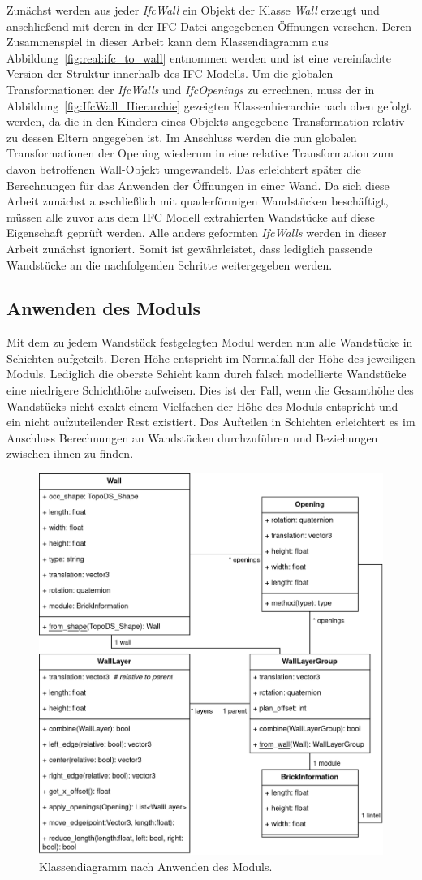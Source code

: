 Zunächst werden aus jeder \textit{IfcWall} ein Objekt der Klasse \textit{Wall} erzeugt und anschließend mit deren in der IFC Datei angegebenen Öffnungen versehen.
Deren Zusammenspiel in dieser Arbeit kann dem Klassendiagramm aus Abbildung~\ref{fig:real:ifc_to_wall} entnommen werden und ist eine vereinfachte Version der Struktur innerhalb des IFC Modells.
Um die globalen Transformationen der \textit{IfcWalls} und \textit{IfcOpenings} zu errechnen, muss der in Abbildung~\ref{fig:IfcWall_Hierarchie} gezeigten Klassenhierarchie nach oben gefolgt werden, da die in den Kindern eines Objekts angegebene Transformation relativ zu dessen Eltern angegeben ist.
Im Anschluss werden die nun globalen Transformationen der Opening wiederum in eine relative Transformation zum davon betroffenen Wall-Objekt umgewandelt.
Das erleichtert später die Berechnungen für das Anwenden der Öffnungen in einer Wand.
Da sich diese Arbeit zunächst ausschließlich mit quaderförmigen Wandstücken beschäftigt, müssen alle zuvor aus dem IFC Modell extrahierten Wandstücke auf diese Eigenschaft geprüft werden.
Alle anders geformten \textit{IfcWalls} werden in dieser Arbeit zunächst ignoriert.
Somit ist gewährleistet, dass lediglich passende Wandstücke an die nachfolgenden Schritte weitergegeben werden.

\subsection{Anwenden des Moduls}
Mit dem zu jedem Wandstück festgelegten Modul werden nun alle Wandstücke in Schichten aufgeteilt.
Deren Höhe entspricht im Normalfall der Höhe des jeweiligen Moduls.
Lediglich die oberste Schicht kann durch falsch modellierte Wandstücke eine niedrigere Schichthöhe aufweisen.
Dies ist der Fall, wenn die Gesamthöhe des Wandstücks nicht exakt einem Vielfachen der Höhe des Moduls entspricht und ein nicht aufzuteilender Rest existiert.
Das Aufteilen in Schichten erleichtert es im Anschluss Berechnungen an Wandstücken durchzuführen und Beziehungen zwischen ihnen zu finden.
\begin{figure}[hbt]
  \centering
  \includegraphics[width=0.7\columnwidth]{fig/klassendiagramm_apply_module.drawio.png}
  \caption{Klassendiagramm nach Anwenden des Moduls.}\label{fig:real:apply_module}
\end{figure}

